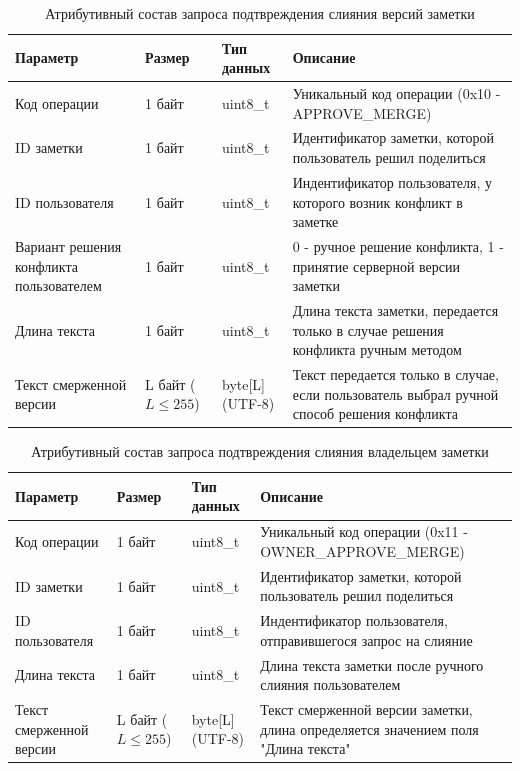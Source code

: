 \begin{table}[H]
    \centering
    \caption{Атрибутивный состав запроса подтвреждения слияния версий заметки}
    \begin{tabular}{|p{4cm}|p{2cm}|p{3cm}|p{6cm}|}
    \hline
    \textbf{Параметр} & \textbf{Размер} & \textbf{Тип данных} & \textbf{Описание} \\ \hline
    Код операции & 1 байт & uint8\_t & Уникальный код операции (0x10 - APPROVE\_MERGE) \\ \hline
    ID заметки & 1 байт & uint8\_t & Идентификатор заметки, которой пользователь решил поделиться \\ \hline
    ID пользователя & 1 байт & uint8\_t & Индентификатор пользователя, у которого возник конфликт в заметке \\ \hline
    Вариант решения конфликта пользователем & 1 байт & uint8\_t & 0 - ручное решение конфликта, 1 - принятие серверной версии заметки \\ \hline
    Длина текста & 1 байт & uint8\_t & Длина текста заметки, передается только в случае решения конфликта ручным методом \\ \hline
    Текст смерженной версии & L байт (\(L \le 255\)) & byte[L] (UTF-8) & Текст передается только в случае, если пользователь выбрал ручной способ решения конфликта \\ \hline
    \end{tabular}
    \label{tab:note_create_request}
\end{table}



\begin{table}[H]
    \centering
    \caption{Атрибутивный состав запроса подтвреждения слияния владельцем заметки}
    \begin{tabular}{|p{4cm}|p{2cm}|p{3cm}|p{6cm}|}
    \hline
    \textbf{Параметр} & \textbf{Размер} & \textbf{Тип данных} & \textbf{Описание} \\ \hline
    Код операции & 1 байт & uint8\_t & Уникальный код операции (0x11 - OWNER\_APPROVE\_MERGE) \\ \hline
    ID заметки & 1 байт & uint8\_t & Идентификатор заметки, которой пользователь решил поделиться \\ \hline
    ID пользователя & 1 байт & uint8\_t & Индентификатор пользователя, отправившегося запрос на слияние \\ \hline
    Длина текста & 1 байт & uint8\_t & Длина текста заметки после ручного слияния пользователем \\ \hline
    Текст смерженной версии & L байт (\(L \le 255\)) & byte[L] (UTF-8) & Текст смерженной версии заметки, длина определяется значением поля "Длина текста" \\ \hline
    \end{tabular}
    \label{tab:note_create_request}
\end{table}


